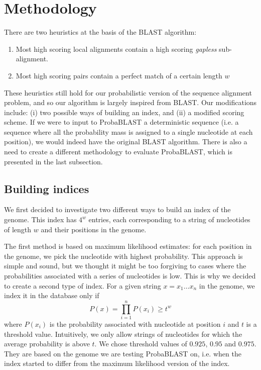 \documentclass[12pt]{IEEEtran}
\begin{document}
\section{Methodology}

There are two heuristics at the basis of the BLAST algorithm:
\begin{enumerate}
\item Most high scoring local alignments contain a high scoring \emph{gapless} sub-alignment.
\item Most high scoring pairs contain a perfect match of a certain length $w$
\end{enumerate}
These heuristics still hold for our probabilistic version of the sequence alignment problem, and so our algorithm is largely inspired from BLAST. Our modifications include: (i) two possible ways of building an index, and (ii) a modified scoring scheme. If we were to input to ProbaBLAST a deterministic sequence (i.e. a sequence where all the probability mass is assigned to a single nucleotide at each position), we would indeed have the original BLAST algorithm. There is also a need to create a different methodology to evaluate ProbaBLAST, which is presented in the last subsection.

\subsection{Building indices}

We first decided to investigate two different ways to build an index of the genome. This index has $4^w$ entries, each corresponding to a string of nucleotides of length $w$ and their positions in the genome.

The first method is based on maximum likelihood estimates: for each position in the genome, we pick the nucleotide with highest probability. This approach is simple and sound, but we thought it might be too forgiving to cases where the probabilities associated with a series of nucleotides is low.
This is why we decided to create a second type of index. For a given string $x=x_1\dots x_n$ in the genome, we index it in the database only if 
$$P(x)=\prod_{i=1}^{n}P(x_i)\geq t^w$$
where $P(x_i)$ is the probability associated with nucleotide at position $i$  and $t$ is a threshold value. Intuitively, we only allow strings of nucleotides for which the average probability is above $t$. We chose threshold values of $0.925$, $0.95$ and $0.975$. They are based on the genome we are testing ProbaBLAST on, i.e. when the index started to differ from the maximum likelihood version of the index.
\end{document}
